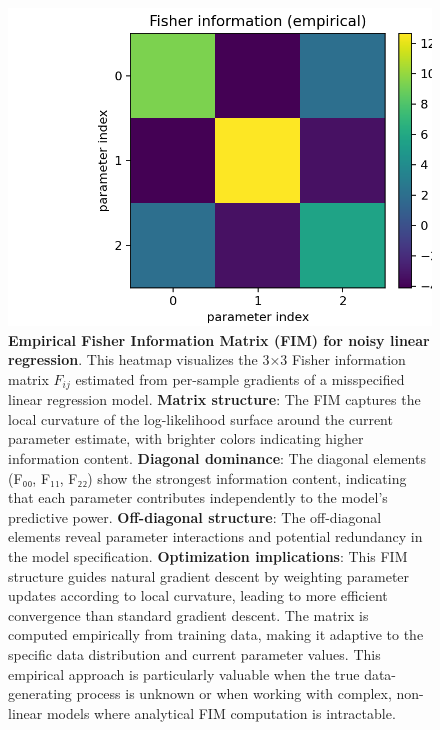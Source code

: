 \documentclass[
  10pt,
]{article}
\begin{document}
\begin{figure}
\centering
\includegraphics{../output/figures/fisher_information_matrix.png}
\caption{\textbf{Empirical Fisher Information Matrix (FIM) for noisy
linear regression}. This heatmap visualizes the 3×3 Fisher information
matrix \(F_{ij}\) estimated from per-sample gradients of a misspecified
linear regression model. \textbf{Matrix structure}: The FIM captures the
local curvature of the log-likelihood surface around the current
parameter estimate, with brighter colors indicating higher information
content. \textbf{Diagonal dominance}: The diagonal elements (F₀₀, F₁₁,
F₂₂) show the strongest information content, indicating that each
parameter contributes independently to the model's predictive power.
\textbf{Off-diagonal structure}: The off-diagonal elements reveal
parameter interactions and potential redundancy in the model
specification. \textbf{Optimization implications}: This FIM structure
guides natural gradient descent by weighting parameter updates according
to local curvature, leading to more efficient convergence than standard
gradient descent. The matrix is computed empirically from training data,
making it adaptive to the specific data distribution and current
parameter values. This empirical approach is particularly valuable when
the true data-generating process is unknown or when working with
complex, non-linear models where analytical FIM computation is
intractable.}
\end{figure}
\end{document}
